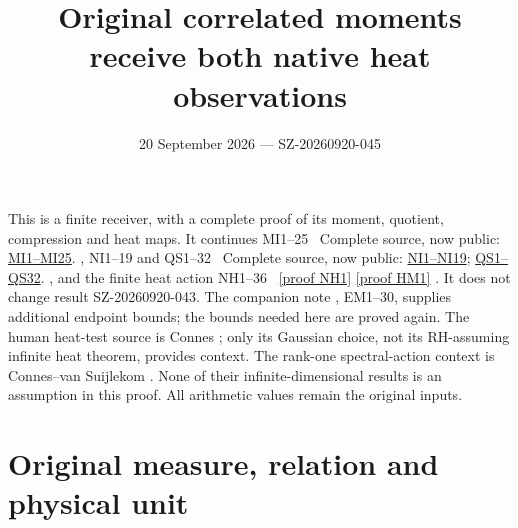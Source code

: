 \documentclass[11pt]{article}
\title{Original correlated moments receive both native heat observations}
\author{}\date{20 September 2026 --- SZ-20260920-045}
\begin{document}
\maketitle

This is a finite receiver, with a complete proof of its moment, quotient,
compression and heat maps. It continues MI1--25 \cite{MI}%
~Complete source, now public: \href{https://github.com/KokunoYumeto/zeta-function-research-reader/blob/128aa308dd2a70ba6e073816a957d1ee6414ba2c/workbenches/splitzero-tandem/continuations/20260921-cited-native-input-sources/MOVING_INTERVAL_NATIVE_PRECISION.tex\#L30}{MI1--MI25}.%
{}, NI1--19 and
QS1--32 \cite{NI}%
~Complete source, now public: \href{https://github.com/KokunoYumeto/zeta-function-research-reader/blob/128aa308dd2a70ba6e073816a957d1ee6414ba2c/workbenches/splitzero-tandem/continuations/20260921-cited-native-input-sources/NATIVE_INPUT_EVALUATION.tex\#L32}{NI1--NI19}; \href{https://github.com/KokunoYumeto/zeta-function-research-reader/blob/128aa308dd2a70ba6e073816a957d1ee6414ba2c/workbenches/splitzero-tandem/continuations/20260921-cited-native-input-sources/QUARTET_MOMENT_SEED_REDUCTION.tex\#L27}{QS1--QS32}.%
{}, and the finite heat action NH1--36 \cite{NH}%
~\href{https://github.com/KokunoYumeto/zeta-function-research-reader/blob/5992ad50c0f2a06921f1fcaded7b4e38097c0739/workbenches/splitzero-tandem/continuations/20260920-original-kernel-mixed-determinants/providers/NATIVE_HEAT_ACTION.tex\#L41}{[proof NH1]} \href{https://github.com/KokunoYumeto/zeta-function-research-reader/blob/5992ad50c0f2a06921f1fcaded7b4e38097c0739/workbenches/splitzero-tandem/continuations/20260920-original-kernel-mixed-determinants/providers/HEAT_METRIC_COMPARISON.tex\#L43}{[proof HM1]}%
{}.
It does not change result SZ-20260920-043. The companion note
, EM1--30,
supplies additional endpoint bounds; the bounds needed here are proved
again. The human heat-test source is Connes \cite{Connes}; only its
Gaussian choice, not its RH-assuming infinite heat theorem, provides
context. The rank-one spectral-action context is Connes--van Suijlekom
\cite{CV}. None of their infinite-dimensional results is an assumption
in this proof. All arithmetic values remain the original inputs.

\section{Original measure, relation and physical unit}
\end{document}
